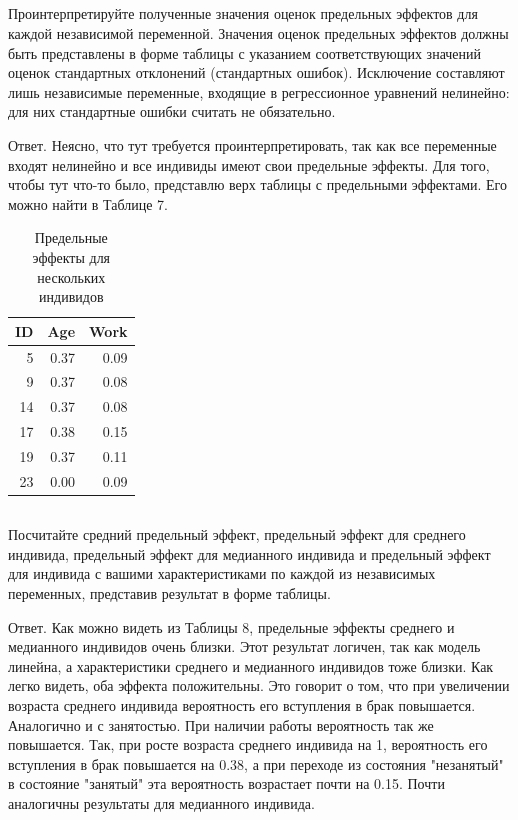\documentclass[a4paper,12pt]{article}
\begin{document}
\subsection{}
\Sun  Проинтерпретируйте полученные значения оценок предельных эффектов для
каждой независимой переменной. Значения оценок предельных эффектов должны быть
представлены в форме таблицы с указанием соответствующих значений оценок
стандартных отклонений (стандартных ошибок). Исключение составляют лишь
независимые переменные, входящие в регрессионное уравнений нелинейно: для них
стандартные ошибки считать не обязательно.

Ответ. Неясно, что тут требуется проинтерпретировать, так как все переменные входят нелинейно и все индивиды имеют свои предельные эффекты. Для того, чтобы тут что-то было, представлю верх таблицы с предельными эффектами. Его можно найти в Таблице 7.

\begin{table}[ht]
	\centering
	\begin{tabular}{|rrr|}
		\hline
		ID & Age & Work \\ 
		\hline
		5 & 0.37 & 0.09 \\ 
		9 & 0.37 & 0.08 \\ 
		14 & 0.37 & 0.08 \\ 
		17 & 0.38 & 0.15 \\ 
		19 & 0.37 & 0.11 \\ 
		23 & 0.00 & 0.09 \\ 
		\hline
	\end{tabular}
\caption{Предельные эффекты для нескольких индивидов}
\end{table} 


\subsection{}

\Sun Посчитайте средний предельный эффект, предельный эффект для среднего
индивида, предельный эффект для медианного индивида и предельный эффект для
индивида с вашими характеристиками по каждой из независимых переменных,
представив результат в форме таблицы.

Ответ. Как можно видеть из Таблицы 8, предельные эффекты среднего и медианного индивидов очень близки. Этот результат логичен, так как модель линейна, а характеристики среднего и медианного индивидов тоже близки. Как легко видеть, оба эффекта положительны. Это говорит о том, что при увеличении возраста среднего индивида вероятность его вступления в брак повышается. Аналогично и с занятостью. При наличии работы вероятность так же повышается. Так, при росте возраста среднего индивида на 1, вероятность его вступления в брак повышается на 0.38, а при переходе из состояния "незанятый" в состояние "занятый" эта вероятность возрастает почти на 0.15. Почти аналогичны результаты для медианного индивида.
\end{document}
